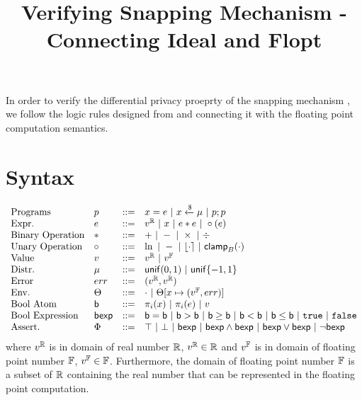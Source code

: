 \documentclass[a4paper,11pt]{article}
\begin{document}
\title{Verifying Snapping Mechanism - Connecting Ideal and Flopt}
\author{}

\date{}

\maketitle
In order to verify the differential privacy proeprty of
the snapping mechanism \cite{mironov2012significance},
we follow the logic rules designed from
\cite{barthe2016proving} and connecting 
it with the floating point computation semantics.
\section{Syntax}
\[\begin{array}{llll}
\mbox{Programs} & \prog & ::= & 
     \varx = \expr ~|~ \varx \samplel \edistr
	~|~ \prog ; \prog \\

\mbox{Expr.} & \expr & ::= & \rval 
	~|~ \varx  ~|~ \expr \bop \expr
	~|~ \uop (\expr) \\
%
\mbox{Binary Operation} & \bop & ::= & + ~|~ - ~|~ \times ~|~ \div \\
%
\mbox{Unary Operation} & \uop & ::= & \ln ~|~ - ~|~ \round{\cdot} 
	~|~ \clamp_B(\cdot) \\
%
\mbox{Value} & \valv & ::= & \rval ~|~  \fval \\
%
\mbox{Distr.} & \edistr & ::= & \uniform(0, 1) 
%
	~|~ \uniform\{-1, 1\}\\ 
%
\mbox{Error} & \err & ::= & (\rval, \rval) \\
%
\mbox{Env.} & \trsenv & ::= & \cdot ~|~ \trsenv[x \mapsto (\fval, \err)] \\
%
\mbox{Bool Atom} & \batom & :: = & \pi_i(\varx) ~|~ \pi_i(\expr) 
	~|~ \valv \\
%
\mbox{Bool Expression} & \bexp & :: = & \batom = \batom ~|~ \batom > \batom
	~|~ \batom \geq \batom ~|~ \batom < \batom ~|~ \batom \leq \batom
	~|~ \etrue ~|~ \efalse \\
%
\mbox{Assert.} & \Phi & ::= & \top ~|~ \bot ~|~ \bexp 
	~|~ \bexp \land \bexp ~|~ \bexp \lor \bexp ~|~ \neg \bexp
\end{array}
\]
where $v^{\mathbb{R}}$ is in domain of real number $\mathbb{R}$, $v^{\mathbb{R}} \in \mathbb{R}$ and $v^{\mathbb{F}}$ is in domain of floating point number $\mathbb{F}$, $v^{\mathbb{F}} \in \mathbb{F}$. Furthermore, the domain of floating point number $\mathbb{F}$ is a subset of $\mathbb{R}$ containing the real number that can be represented in the floating point computation.
\end{document}
